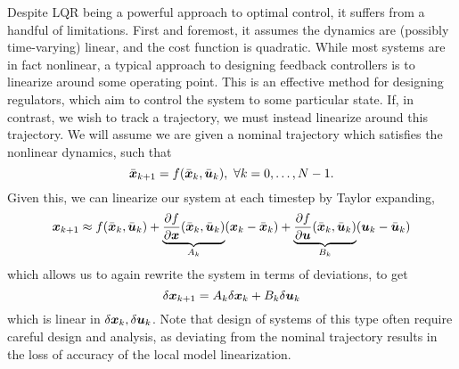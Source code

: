 Despite LQR being a powerful approach to optimal control, it suffers from a handful of limitations. First and foremost, it assumes the dynamics are (possibly time-varying) linear, and the cost function is quadratic. While most systems are in fact nonlinear, a typical approach to designing feedback controllers is to linearize around some operating point. This is an effective method for designing regulators, which aim to control the system to some particular state. If, in contrast, we wish to track a trajectory, we must instead linearize around this trajectory. We will assume we are given a nominal trajectory which satisfies the nonlinear dynamics, such that
\begin{equation}
    \bar{\bm{x}}_{k+1} = f(\bar{\bm{x}}_k,\bar{\bm{u}}_k),\,\, \forall k = 0, \ldots, N-1. 
\end{equation}
Given this, we can linearize our system at each timestep by Taylor expanding,
\begin{equation}
    \bm{x}_{k+1} \approx f(\bar{\bm{x}}_k,\bar{\bm{u}}_k) + \underbrace{\frac{\partial f}{\partial \bm{x}} (\bar{\bm{x}}_k, \bar{\bm{u}}_k)}_{A_k} (\bm{x}_k - \bar{\bm{x}}_k) + \underbrace{\frac{\partial f}{\partial \bm{u}} (\bar{\bm{x}}_k, \bar{\bm{u}}_k)}_{B_k} (\bm{u}_k - \bar{\bm{u}}_k)
\end{equation}
which allows us to again rewrite the system in terms of deviations, to get
\begin{equation}
    \delta \bm{x}_{k+1} = A_k \delta \bm{x}_k + B_k \delta \bm{u}_k
\end{equation}
which is linear in $\delta \bm{x}_k, \delta \bm{u}_k$.  Note that design of systems of this type often require careful design and analysis, as deviating from the nominal trajectory results in the loss of accuracy of the local model linearization. 

